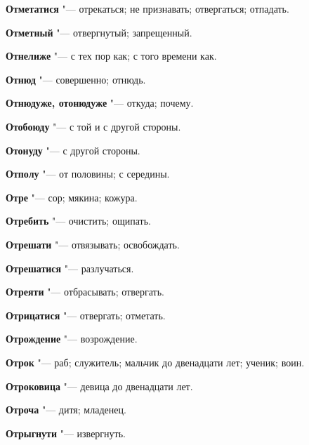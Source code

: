 \begin{mymulticols}{2}
\noindent\textbf{Отметатися} "--- отрекаться; не признавать; отвергаться; отпадать. 




\noindent\textbf{Отметный} "--- отвергнутый; запрещенный. 




\noindent\textbf{Отнелиже} "--- с тех пор как; с того времени как. 




\noindent\textbf{Отнюд} "--- совершенно; отнюдь. 




\noindent\textbf{Отнюдуже, отонюдуже} "--- откуда; почему. 




\noindent\textbf{Отобоюду} "--- с той и с другой стороны. 




\noindent\textbf{Отонуду} "--- с другой стороны. 




\noindent\textbf{Отполу} "--- от половины; с середины. 




\noindent\textbf{Отре} "--- сор; мякина; кожура. 




\noindent\textbf{Отребить} "--- очистить; ощипать. 




\noindent\textbf{Отрешати} "--- отвязывать; освобождать. 




\noindent\textbf{Отрешатися} "--- разлучаться. 




\noindent\textbf{Отреяти} "--- отбрасывать; отвергать. 




\noindent\textbf{Отрицатися} "--- отвергать; отметать. 




\noindent\textbf{Отрождение} "--- возрождение. 




\noindent\textbf{Отрок} "--- раб; служитель; мальчик до двенадцати лет; ученик; воин. 




\noindent\textbf{Отроковица} "--- девица до двенадцати лет. 




\noindent\textbf{Отроча} "--- дитя; младенец. 




\noindent\textbf{Отрыгнути} "--- извергнуть. 





\end{mymulticols}
